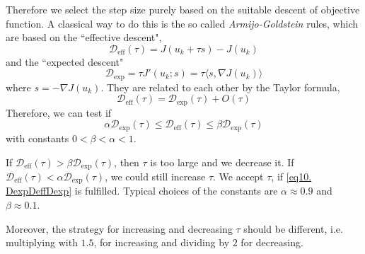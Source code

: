 Therefore we select the step size purely based on the suitable descent of objective function. A classical way to do this is the so called \textit{Armijo-Goldstein} rules, which are based on the ``effective descent",
\[
\mathcal{D}_{\text{eff}}(\tau) = J(u_k+\tau s)-J(u_k)
\]
and the ``expected descent"
\[
	\mathcal{D}_{\text{exp}} = \tau J'(u_k;s)=\tau \langle s, \nabla J(u_k)\rangle
\]
where  $s=-\nabla J(u_k)$. They are related to each other by the Taylor formula,
\[
	\mathcal{D}_{\text{eff}}(\tau)=\mathcal{D}_{\text{exp}}(\tau)+O(\tau)
\]
Therefore, we can test if 
\begin{equation}
\alpha \mathcal{D}_{\text{exp}}(\tau)\leq \mathcal{D}_{\text{eff}}(\tau) \leq \beta \mathcal{D}_{\text{exp}}(\tau) \label{eq10. DexpDeffDexp} \tag{\EOPatron}
\end{equation}
with constants $0<\beta<\alpha<1$. 

If $\mathcal{D}_{\text{eff}}(\tau) > \beta \mathcal{D}_{\text{exp}}(\tau)$, then $\tau$ is too large and we decrease it. 
If $\mathcal{D}_{\text{eff}}(\tau)<\alpha\mathcal{D}_{\text{exp}}(\tau)$, we could still increase $\tau$. We accept $\tau$, if 
\eqref{eq10. DexpDeffDexp} is fulfilled. Typical choices of the constants are $\alpha \approx 0.9$ and $\beta \approx 0.1$.

Moreover, the strategy for increasing and decreasing $\tau$ should be different, i.e. multiplying with $1.5$, for increasing and dividing by $2$ for decreasing.

